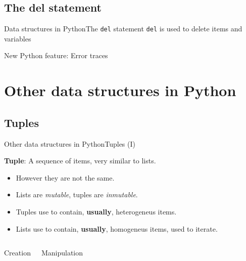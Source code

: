 \documentclass[10pt,compress]{beamer} %
\begin{document}
\subsection{The del statement}
\begin{frame}[plain]{Data structures in Python}{The \texttt{del} statement}
	\texttt{del} is used to delete items and variables

	\footnotesize{
		\begin{block}{}
		\vspace{-0.2cm}
		
		\vspace{-0.2cm}
		\end{block}
	}

	\normalsize{New Python feature: Error traces}
\end{frame}

\section{Other data structures in Python}
\subsection{Tuples}
\begin{frame}{Other data structures in Python}{Tuples (I)}

	\textbf{Tuple}: A sequence of items, very similar to lists.
		\begin{itemize}
		\item \small However they are not the same.
		\item \small Lists are \textit{mutable}, tuples are \textit{inmutable}.
		\item \small Tuples use to contain, \textbf{usually}, heterogeneus items.
		\item \small Lists use to contain, \textbf{usually}, homogeneus items, used to iterate.
		\end{itemize}
	
	    \begin{columns}
 	   \column{.38\textwidth}
 	   \scriptsize{
		\begin{block}{Creation}
		\vspace{-0.2cm}
		
		\vspace{-0.2cm}
		\end{block}
		}
       \vspace{4cm}
 	   \column{.62\textwidth}
 	   \scriptsize{
		\begin{block}{Manipulation}
		\vspace{-0.2cm}
		
		\vspace{-0.3cm}	
		\end{block}
		}
		\vspace{2.9 cm}

	\end{columns}
\end{frame}
\end{document}
